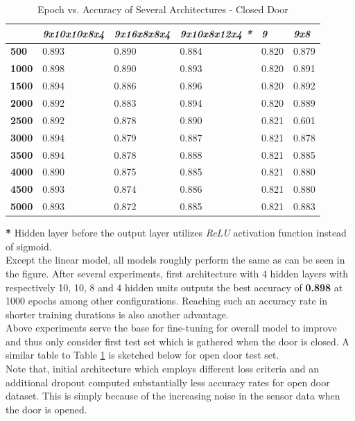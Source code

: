 \documentclass[conference]{IEEEtran}
\begin{document}
\begin{table}[H]
	\centering
	\caption{Epoch vs. Accuracy of Several Architectures - Closed Door}
	\label{AllArches}
	\begin{tabular}{|l|l|l|l|l|l|}
		\hline
		& \textit{9x10x10x8x4} 
		& \textit{9x16x8x8x4}
		& \textit{9x10x8x12x4 \textbf{*}}
		& \textit{9}
		& \textit{9x8}\\ \hline
		\textbf{500} & 0.893 & 0.890 & 0.884 & 0.820 & 0.879\\ \hline
		\textbf{1000} & \cellcolor{green!25}0.898 & 0.890 & 0.893 & 0.820 & 0.891\\
		\hline
		\textbf{1500} & 0.894 & 0.886 & 0.896 & 0.820 & 0.892\\ \hline
		\textbf{2000} & 0.892& 0.883 & 0.894 & 0.820 & 0.889\\ \hline
		\textbf{2500} & 0.892 & 0.878 & 0.890 &  0.821 & 0.601\\
		\hline
		\textbf{3000} & 0.894 & 0.879 & 0.887 & 0.821 & 0.878\\ \hline
		\textbf{3500} & 0.894 & 0.878 & 0.888 & 0.821 & 0.885\\ \hline
		\textbf{4000} & 0.890 & 0.875 & 0.885 & 0.821 & 0.880\\ \hline
		\textbf{4500} & 0.893 & 0.874 & 0.886 & 0.821 & 0.880\\ \hline
		\textbf{5000} & 0.893 &  0.872 & 0.885 & 0.821 & 0.883\\ \hline
	\end{tabular}
\end{table}
\indent\textbf{*} Hidden layer before the output layer utilizes \textit{ReLU} activation function instead of sigmoid.\\

Except the linear model, all models roughly perform the same as can be seen in the figure. After several experiments, first architecture with 4 hidden layers with respectively 10, 10, 8 and 4 hidden units outputs the best accuracy of \textbf{0.898} at 1000 epochs among other configurations. Reaching such an accuracy rate in shorter training durations is also another advantage.\\

Above experiments serve the base for fine-tuning for overall model to improve and thus only consider first test set which is gathered when the door is closed. A similar table to Table \ref{AllArches} is sketched below for open door test set.\\

Note that, initial architecture which employs different loss criteria and an additional dropout computed  substantially less accuracy rates for open door dataset. This is simply because of the increasing noise in the sensor data when the door is opened.
\end{document}
